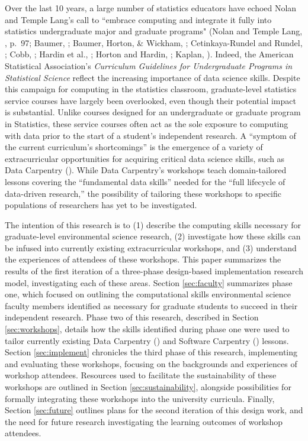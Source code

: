 \documentclass[12pt]{article}
\begin{document}
\quad Over the last 10 years, a large number of statistics educators have echoed
Nolan and Temple Lang's call to ``embrace computing and integrate it fully into 
statistics undergraduate major and graduate programs" (Nolan and Temple Lang, 
\citeyear{nolan}, p.\ 97; Baumer, \citeyear{baumer_datascience}; Baumer, Horton, 
\& Wickham, \citeyear{horton_takingachance}; Cetinkaya-Rundel and Rundel, 
\citeyear{mine}; Cobb, \citeyear{cobb}; Hardin et al., \citeyear{hardin}; Horton
and Hardin, \citeyear{horton_thinkwithdata}; Kaplan, \citeyear{kaplan}). Indeed,
the American Statistical Association's \citeyear{asa} \emph{Curriculum
Guidelines for Undergraduate Programs in Statistical Science} reflect the
increasing importance of data science skills. Despite this campaign for
computing in the statistics classroom, graduate-level statistics service courses
have largely been overlooked, even though their potential impact is substantial.
Unlike courses designed for an undergraduate or graduate program in Statistics,
these service courses often act as the sole exposure to computing with data
prior to the start of a student's independent research. A ``symptom of the
current curriculum's shortcomings'' \citep[p.\ 547]{hampton} is the emergence of
a variety of extracurricular opportunities for acquiring critical data science
skills, such as Data Carpentry (\citeyear{data-carpentry}). While Data 
Carpentry's workshops teach domain-tailored lessons covering the ``fundamental
data skills'' needed for the ``full lifecycle of data-driven research,'' the 
possibility of tailoring these workshops to specific populations of researchers
has yet to be investigated. 

\quad The intention of this research is to (1) describe the computing skills 
necessary for graduate-level environmental science research, (2)
investigate how these skills can be infused into currently existing
extracurricular workshops, and (3) understand the experiences of attendees of
these workshops. This paper summarizes the results of the first iteration of a 
three-phase design-based implementation research model, investigating each of
these areas. Section \ref{sec:faculty} summarizes phase one, which focused on 
outlining the computational skills environmental science faculty members
identified as necessary for graduate students to succeed in their independent
research. Phase two of this research, described in Section \ref{sec:workshops},
details how the skills identified during phase one were used to tailor
currently existing Data Carpentry (\citeyear{data-carpentry}) and Software
Carpentry (\citeyear{software-carpentry}) lessons.
Section \ref{sec:implement} chronicles the third phase of this research, 
implementing and evaluating these workshops, focusing on the backgrounds and 
experiences of workshop attendees. Resources used to facilitate the
sustainability of these workshops are outlined in Section 
\ref{sec:sustainability}, alongside possibilities for formally integrating these
workshops into the university curricula. Finally, Section \ref{sec:future}
outlines plans for the second iteration of this design work, and the need for
future research investigating the learning outcomes of workshop attendees.
\end{document}
